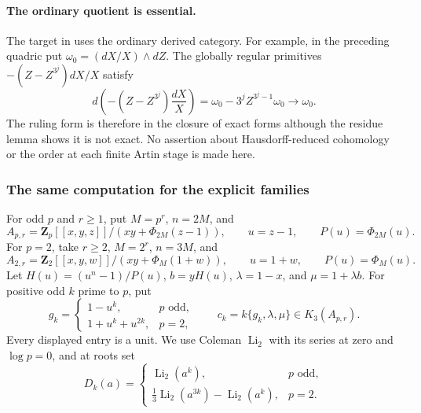 \documentclass[11pt,a4paper]{amsart}
\numberwithin{equation}{section}
\theoremstyle{definition}
\theoremstyle{remark}
\begin{document}
\paragraph{The ordinary quotient is essential.}
The target in \cite[Constructions~4.6 and~4.11]{AMMN} uses the
ordinary derived category. For example, in the preceding quadric put
$\omega_0=(dX/X)\wedge dZ$. The globally regular primitives
$-(Z-Z^{3^j})dX/X$ satisfy
\[
 d\!\left(-(Z-Z^{3^j})\frac{dX}{X}\right)
   =\omega_0-3^jZ^{3^j-1}\omega_0\longrightarrow\omega_0.
\]
The ruling form is therefore in the closure of exact forms although
the residue lemma shows it is not exact. No assertion about
Hausdorff-reduced cohomology or the order at each finite Artin stage
is made here.

\subsubsection{The same computation for the explicit families}

For odd $p$ and $r\ge1$, put $M=p^r$, $n=2M$, and
\[
 A_{p,r}=\mathbf Z_p[[x,y,z]]/(xy+\Phi_{2M}(z-1)),
 \qquad u=z-1,\qquad P(u)=\Phi_{2M}(u).
\]
For $p=2$, take $r\ge2$, $M=2^r$, $n=3M$, and
\[
 A_{2,r}=\mathbf Z_2[[x,y,w]]/(xy+\Phi_M(1+w)),
 \qquad u=1+w,\qquad P(u)=\Phi_M(u).
\]
Let $H(u)=(u^n-1)/P(u)$, $b=yH(u)$,
$\lambda=1-x$, and $\mu=1+\lambda b$. For positive odd $k$ prime
to $p$, put
\[
 g_k=\begin{cases}1-u^k,&p\text{ odd},\\
                  1+u^k+u^{2k},&p=2,
       \end{cases}
 \qquad c_k=k\{g_k,\lambda,\mu\}\in K_3(A_{p,r}).
\]
Every displayed entry is a unit. We use Coleman $\operatorname{Li}_2$
with its series at zero and $\log p=0$, and at roots set
\[
 D_k(a)=\begin{cases}
       \operatorname{Li}_2(a^k),&p\text{ odd},\\
       \tfrac13\operatorname{Li}_2(a^{3k})-
                        \operatorname{Li}_2(a^k),&p=2.
       \end{cases}
\]
\end{document}
